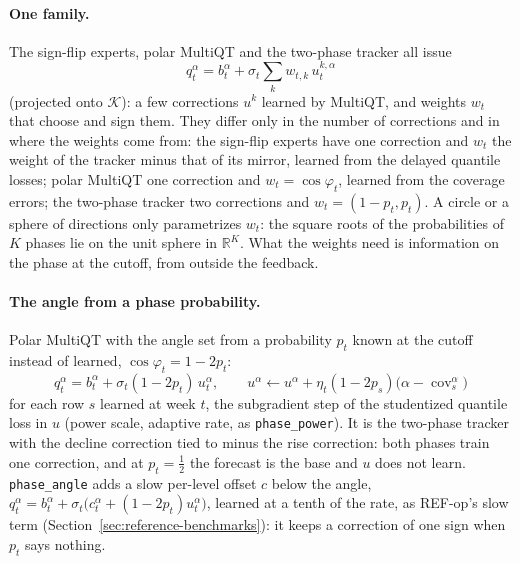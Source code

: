 \documentclass[11pt,a4paper]{article}
\newcommand{\R}{\mathbb{R}}
\newcommand{\K}{\mathcal{K}}
\DeclareMathOperator{\cov}{cov}
\theoremstyle{definition}
\theoremstyle{remark}
\begin{document}
\paragraph{One family.} The sign-flip experts, polar MultiQT and the
two-phase tracker all issue
\begin{equation}
 q_t^\alpha=b_t^\alpha+\sigma_t\sum_k w_{t,k}\,u_t^{k,\alpha}
 \label{eq:phase-family}
\end{equation}
(projected onto $\K$): a few corrections $u^k$ learned by MultiQT, and
weights $w_t$ that choose and sign them. They differ only in the number
of corrections and in where the weights come from: the sign-flip experts
have one correction and $w_t$ the weight of the tracker minus that of its
mirror, learned from the delayed quantile losses; polar MultiQT one
correction and $w_t=\cos\varphi_t$, learned from the coverage errors; the
two-phase tracker two corrections and $w_t=(1-p_t,p_t)$. A circle or a
sphere of directions only parametrizes $w_t$: the square roots of the
probabilities of $K$ phases lie on the unit sphere in $\R^K$. What the
weights need is information on the phase at the cutoff, from outside the
feedback.

\paragraph{The angle from a phase probability.} Polar MultiQT with the
angle set from a probability $p_t$ known at the cutoff instead of learned,
$\cos\varphi_t=1-2p_t$:
\begin{equation}
 q_t^\alpha=b_t^\alpha+\sigma_t(1-2p_t)\,u_t^\alpha,\qquad
 u^\alpha\leftarrow u^\alpha+\eta_t(1-2p_s)\bigl(\alpha-\cov_s^\alpha\bigr)
 \label{eq:phase-angle}
\end{equation}
for each row $s$ learned at week $t$, the subgradient step of the
studentized quantile loss in $u$ (power scale, adaptive rate, as
\texttt{phase\_power}). It is the two-phase tracker with the decline
correction tied to minus the rise correction: both phases train one
correction, and at $p_t=\frac12$ the forecast is the base and $u$ does not
learn. \texttt{phase\_angle} adds a slow per-level offset $c$ below the
angle,
$q_t^\alpha=b_t^\alpha+\sigma_t\bigl(c_t^\alpha+(1-2p_t)u_t^\alpha\bigr)$,
learned at a tenth of the rate, as REF-op's slow term
(Section~\ref{sec:reference-benchmarks}): it keeps a correction of one sign
when $p_t$ says nothing.
\end{document}
